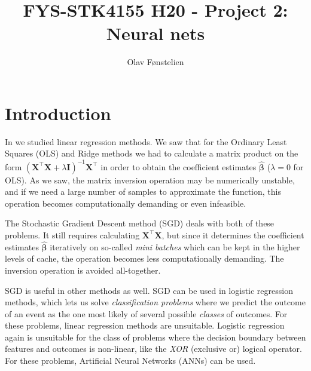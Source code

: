 \documentclass[]{article}
\title{FYS-STK4155 H20 - Project 2:\\Neural nets}
\author{Olav Fønstelien}
\begin{document}
\maketitle

\begin{abstract}

\end{abstract}

\section{Introduction} \label{intro}

In \cite{project1} we studied linear regression methods. We saw that for the Ordinary Least Squares (OLS) and Ridge methods we had to calculate a matrix product on the form $(\mathbf{X}^\intercal \mathbf{X} + \lambda \mathbf{I})^{-1} \mathbf{X}^\intercal$ in order to obtain the coefficient estimates $\mathbf{\hat{\beta}}$ ($\lambda = 0$ for OLS). As we saw, the matrix inversion operation may be numerically unstable, and if we need a large number of samples to approximate the function, this operation becomes computationally demanding or even infeasible. 

The Stochastic Gradient Descent method (SGD) deals with both of these problems. It still requires calculating $\mathbf{X}^\intercal \mathbf{X}$, but since it determines the coefficient estimates $\mathbf{\hat{\beta}}$ iteratively on so-called \textit{mini batches} which can be kept in the higher levels of cache, the operation becomes less computationally demanding. The inversion operation is avoided all-together. 

SGD is useful in other methods as well. SGD can be used in logistic regression methods, which lets us solve \textit{classification problems} where we predict the outcome of an event as the one most likely of several possible \textit{classes} of outcomes. For these problems, linear regression methods are unsuitable. Logistic regression again is unsuitable for the class of problems where the decision boundary between features and outcomes is non-linear, like the \textit{XOR} (exclusive or) logical operator. For these problems, Artificial Neural Networks (ANNs) can be used.
\end{document}
